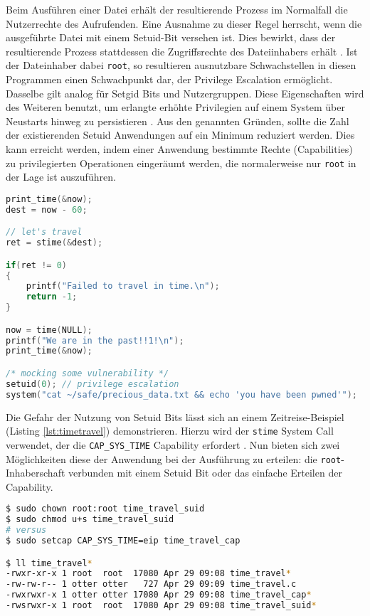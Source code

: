 Beim Ausführen einer Datei erhält der resultierende Prozess im Normalfall die Nutzerrechte des Aufrufenden. Eine Ausnahme zu dieser Regel herrscht, wenn die ausgeführte Datei mit einem Setuid-Bit versehen ist. Dies bewirkt, dass der resultierende Prozess stattdessen die Zugriffsrechte des Dateiinhabers erhält \cite{chmod}. Ist der Dateinhaber dabei \texttt{root}, so resultieren ausnutzbare Schwachstellen in diesen Programmen einen Schwachpunkt dar, der Privilege Escalation ermöglicht. Dasselbe gilt analog für Setgid
Bits und Nutzergruppen. Diese Eigenschaften wird des Weiteren benutzt, um erlangte erhöhte Privilegien auf einem System über Neustarts hinweg zu persistieren \cite{attack-setuid}. Aus den genannten Gründen, sollte die Zahl der existierenden Setuid Anwendungen auf ein Minimum reduziert werden. Dies kann erreicht werden, indem einer Anwendung bestimmte Rechte (Capabilities) zu privilegierten Operationen eingeräumt werden, die normalerweise nur \texttt{root} in der Lage ist
auszuführen. 

\begin{lstlisting}[language=c,label=lst:timetravel,caption={Zeitreise mittels \texttt{stime} und der Versuch die Privilegien auf \texttt{root} auszuweiten}]
print_time(&now);
dest = now - 60;

// let's travel
ret = stime(&dest);

if(ret != 0)
{
    printf("Failed to travel in time.\n");
    return -1;
}

now = time(NULL);
printf("We are in the past!!1!\n");
print_time(&now);

/* mocking some vulnerability */
setuid(0); // privilege escalation
system("cat ~/safe/precious_data.txt && echo 'you have been pwned'");
\end{lstlisting}

Die Gefahr der Nutzung von Setuid Bits lässt sich an einem Zeitreise-Beispiel (Listing \ref{lst:timetravel}) demonstrieren. Hierzu wird der \texttt{stime} System Call verwendet, der die \texttt{CAP\_SYS\_TIME} Capability erfordert \cite{man-cap}. Nun bieten sich zwei Möglichkeiten diese der Anwendung bei der Ausführung zu erteilen: die \texttt{root}-Inhaberschaft verbunden mit einem Setuid Bit oder das einfache Erteilen der Capability.


\begin{lstlisting}[language=bash,label={lst:timetravel}]
$ sudo chown root:root time_travel_suid
$ sudo chmod u+s time_travel_suid 
# versus
$ sudo setcap CAP_SYS_TIME=eip time_travel_cap

$ ll time_travel*
-rwxr-xr-x 1 root  root  17080 Apr 29 09:08 time_travel*
-rw-rw-r-- 1 otter otter   727 Apr 29 09:09 time_travel.c
-rwxrwxr-x 1 otter otter 17080 Apr 29 09:08 time_travel_cap*
-rwsrwxr-x 1 root  root  17080 Apr 29 09:08 time_travel_suid*
\end{lstlisting}

